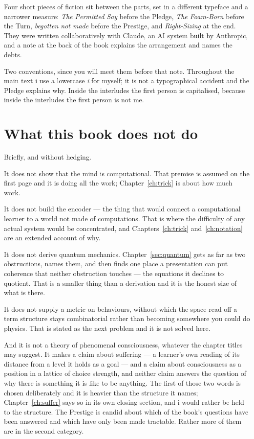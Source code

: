 Four short pieces of fiction sit between the parts, set in a
different typeface and a narrower measure: \emph{The Permitted Say}
before the Pledge, \emph{The Foam-Born} before the Turn,
\emph{begotten not made} before the Prestige, and
\emph{Right-Sizing} at the end.
They were written collaboratively with Claude, an AI system built
by Anthropic, and a note at the back of the book explains the
arrangement and names the debts.

Two conventions, since you will meet them before that note.
Throughout the main text i use a lowercase \emph{i} for myself; it
is not a typographical accident and the Pledge explains why.
Inside the interludes the first person is capitalised, because
inside the interludes the first person is not me.

\section*{What this book does not do}

Briefly, and without hedging.

It does not show that the mind is computational.
That premise is assumed on the first page and it is doing all the
work; Chapter~\ref{ch:trick} is about how much work.

It does not build the encoder --- the thing that would connect a
computational learner to a world not made of computations.
That is where the difficulty of any actual system would be
concentrated, and Chapters~\ref{ch:trick}
and~\ref{ch:notation} are an extended account of why.

It does not derive quantum mechanics.
Chapter~\ref{sec:quantum} gets as far as two obstructions, names
them, and then finds one place a presentation can put coherence
that neither obstruction touches --- the equations it declines to
quotient.
That is a smaller thing than a derivation and it is the honest size
of what is there.

It does not supply a metric on behaviours, without which the space
read off a term structure stays combinatorial rather than
becoming somewhere you could do physics.
That is stated as the next problem and it is not solved here.

And it is not a theory of phenomenal consciousness, whatever the
chapter titles may suggest.
It makes a claim about suffering --- a learner's own reading of its
distance from a level it holds as a goal --- and a claim about
consciousness as a position in a lattice of choice strength, and
neither claim answers the question of why there is something it is like
to be anything.
The first of those two words is chosen deliberately and it is heavier
than the structure it names; Chapter~\ref{ch:suffer} says so in its own
closing section, and i would rather be held to the structure.
The Prestige is candid about which of the book's questions have
been answered and which have only been made tractable.
Rather more of them are in the second category.

